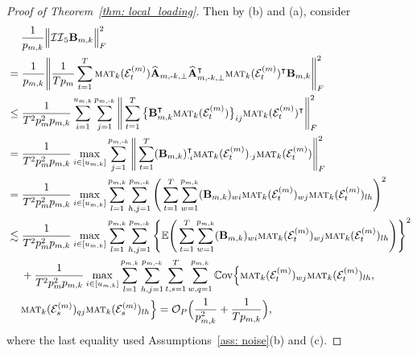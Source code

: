 \documentclass[aos]{imsart}
\theoremstyle{plain}
\theoremstyle{definition}
\def\mat{\textnormal{\textsc{mat}}}
\def\wh#1{\widehat{#1}}
\def\E{\mathbb{E}}
\def\cE{\mathcal{E}}
\def\cII{\mathcal{II}}
\def\cO{\mathcal{O}}
\def\bA{\mathbf{A}}
\def\bB{\mathbf{B}}
\def\trans{\intercal}
\def\cov{\mathbb{C}\mathrm{ov}}
\begin{document}
\begin{proof}[Proof of Theorem~\ref{thm: local_loading}]
Then by (b) and (a), consider
\begin{align}
    &\;\quad
    \frac{1}{p_{m,k}} \Big\| \cII_5 \bB_{m,k} \Big\|_F^2 \notag \\
    &=
    \frac{1}{p_{m,k}} \Bigg\| \frac{1}{Tp_m} \sum_{t=1}^T \mat_k(\cE_t^{(m)}) \wh{\bA}_{m,\text{-}k,\perp} \wh{\bA}_{m,\text{-}k,\perp}^\trans \mat_k(\cE_t^{(m)})^\trans \bB_{m,k} \Bigg\|_F^2 \notag \\
    &\leq
    \frac{1}{T^2 p_m^2 p_{m,k}} \sum_{i=1}^{u_{m,k}} \sum_{j=1}^{p_{m,\text{-}k}} \Bigg\| \sum_{t=1}^T \big\{ \bB_{m,k}^\trans \mat_k(\cE_t^{(m)}) \big\}_{ij} \mat_k(\cE_t^{(m)})^\trans \Bigg\|_F^2 \notag \\
    &=
    \frac{1}{T^2 p_m^2 p_{m,k}} \max_{i\in[u_{m,k}]} \sum_{j=1}^{p_{m,\text{-}k}} \Bigg\| \sum_{t=1}^T (\bB_{m,k})_{\cdot i}^\trans \mat_k(\cE_t^{(m)})_{\cdot j} \mat_k(\cE_t^{(m)}) \Bigg\|_F^2 \notag \\
    &=
    \frac{1}{T^2 p_m^2 p_{m,k}} \max_{i\in[u_{m,k}]} \sum_{l=1}^{p_{m,k}} \sum_{h,j=1}^{p_{m,\text{-}k}} \Bigg( \sum_{t=1}^T \sum_{w=1}^{p_{m,k}} (\bB_{m,k})_{wi} \mat_k(\cE_t^{(m)})_{wj} \mat_k(\cE_t^{(m)})_{lh} \Bigg)^2 \notag \\
    &\lesssim
    \frac{1}{T^2 p_m^2 p_{m,k}} \max_{i\in[u_{m,k}]} \sum_{l=1}^{p_{m,k}} \sum_{h,j=1}^{p_{m,\text{-}k}} \Bigg\{ \E\Bigg( \sum_{t=1}^T \sum_{w=1}^{p_{m,k}} (\bB_{m,k})_{wi} \mat_k(\cE_t^{(m)})_{wj} \mat_k(\cE_t^{(m)})_{lh} \Bigg) \Bigg\}^2 \notag \\
    &\;\quad
    + \frac{1}{T^2 p_m^2 p_{m,k}} \max_{i\in[u_{m,k}]} \sum_{l=1}^{p_{m,k}} \sum_{h,j=1}^{p_{m,\text{-}k}} \sum_{t,s=1}^T \sum_{w,q=1}^{p_{m,k}} \cov\Big\{ \mat_k(\cE_t^{(m)})_{wj} \mat_k(\cE_t^{(m)})_{lh}, \notag \\
    &\;\quad
    \mat_k(\cE_s^{(m)})_{qj} \mat_k(\cE_s^{(m)})_{lh} \Big\}
    =
    \cO_P\Big( \frac{1}{p_{m,k}^2} + \frac{1}{T p_{m,k}} \Big) ,
    \label{eqn: cII_5_Bmk}
\end{align}
where the last equality used Assumptions~\ref{ass: noise}(b) and (c).


\end{proof}
\end{document}
